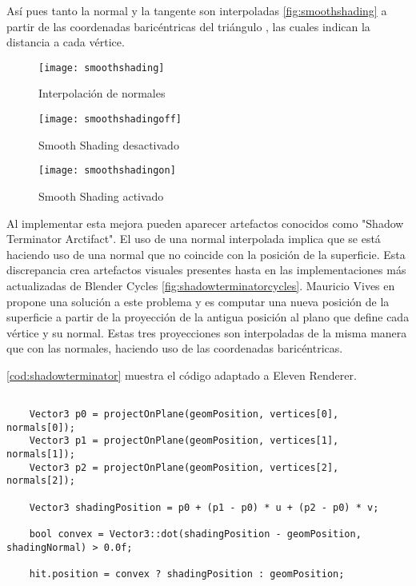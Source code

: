 Así pues tanto la normal y la tangente son interpoladas \autoref{fig:smoothshading} a partir de las coordenadas baricéntricas del triángulo , las cuales indican la distancia a cada vértice.
	
\begin{figure}[H]
    \centering
	\texttt{[image: smoothshading]}
	\caption{Interpolación de normales}
	\label{fig:smoothshading}
\end{figure}

\begin{figure}[H]
		\centering
		\begin{minipage}[b]{0.4\textwidth}
		\texttt{[image: smoothshadingoff]}
		\caption{Smooth Shading desactivado}
		\label{fig:smoothshadingoff}
	  \end{minipage}
	  \hfill
	  \begin{minipage}[b]{0.4\textwidth}
		\texttt{[image: smoothshadingon]}
		\caption{Smooth Shading activado}
		\label{fig:smoothshadingon}
	  \end{minipage}
	  	\hfill
\end{figure}


Al implementar esta mejora pueden aparecer artefactos conocidos como "Shadow Terminator Arctifact". El uso de una normal interpolada implica que se está haciendo uso de una normal que no coincide con la posición de la superficie. Esta discrepancia crea artefactos visuales presentes hasta en las implementaciones más actualizadas de Blender Cycles \autoref{fig:shadowterminatorcycles}. Mauricio Vives en \cite{shadowterminatorrepo} propone una solución a este problema y es computar una nueva posición de la superficie a partir de la proyección de la antigua posición al plano que define cada vértice y su normal. Estas tres proyecciones son interpoladas de la misma manera que con las normales, haciendo uso de las coordenadas baricéntricas.
	
\autoref{cod:shadowterminator} muestra el código adaptado a Eleven Renderer.

\begin{minipage}[c]{0.95\textwidth}
\begin{lstlisting}[label={cod:shadowterminator}, caption={Código Shadow Terminator}]
	
	Vector3 p0 = projectOnPlane(geomPosition, vertices[0], normals[0]);
    Vector3 p1 = projectOnPlane(geomPosition, vertices[1], normals[1]);
    Vector3 p2 = projectOnPlane(geomPosition, vertices[2], normals[2]);

    Vector3 shadingPosition = p0 + (p1 - p0) * u + (p2 - p0) * v;

    bool convex = Vector3::dot(shadingPosition - geomPosition, shadingNormal) > 0.0f;
	
	hit.position = convex ? shadingPosition : geomPosition;
	
\end{lstlisting}
\end{minipage}

